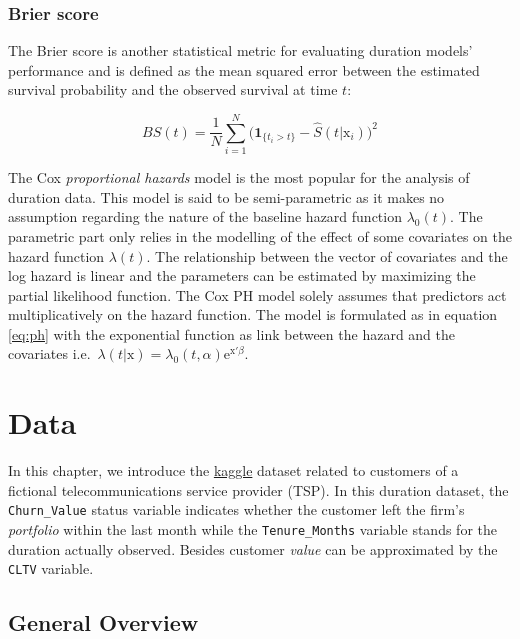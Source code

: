 \documentclass[
]{book}
\begin{document}
\hypertarget{brier-score}{%
\subsection{Brier score}\label{brier-score}}

The Brier score is another statistical metric for evaluating duration models' performance and is defined as the mean squared error between the estimated survival probability and the observed survival at time \(t\):

\begin{equation}
  BS(t) = \frac{1}{N} \sum_{i=1}^{N} \Big(\pmb{1}_{\{t_i>t\}} - \hat{S}(t|\mathrm{x}_i) \Big)^2
  \label{eq:brier}
\end{equation}

The Cox \emph{proportional hazards} model is the most popular for the analysis of duration data. This model is said to be semi-parametric as it makes no assumption regarding the nature of the baseline hazard function \(\lambda_0(t)\). The parametric part only relies in the modelling of the effect of some covariates on the hazard function \(\lambda(t)\). The relationship between the vector of covariates and the log hazard is linear and the parameters can be estimated by maximizing the partial likelihood function. The Cox PH model solely assumes that predictors act multiplicatively on the hazard function. The model is formulated as in equation \eqref{eq:ph} with the exponential function as link between the hazard and the covariates i.e.~\(\lambda(t|\pmb{\mathrm{x}}) = \lambda_0 (t,\alpha) \text{e}^{\pmb{\mathrm{x'}} \beta}\).

\hypertarget{data}{%
\chapter{Data}\label{data}}

In this chapter, we introduce the \href{https://www.kaggle.com/yeanzc/telco-customer-churn-ibm-dataset}{kaggle} dataset related to customers of a fictional telecommunications service provider (TSP). In this duration dataset, the \texttt{Churn\_Value} status variable indicates whether the customer left the firm's \emph{portfolio} within the last month while the \texttt{Tenure\_Months} variable stands for the duration actually observed. Besides customer \emph{value} can be approximated by the \texttt{CLTV} variable.

\hypertarget{general-overview}{%
\section{General Overview}\label{general-overview}}
\end{document}
